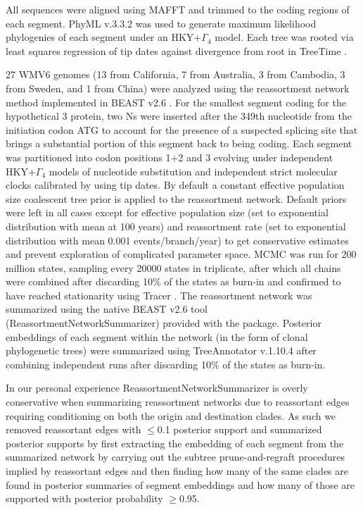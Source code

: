 \documentclass[11pt,twocolumn]{article}
\begin{document}
All sequences were aligned using MAFFT \citep{katoh_mafft_2005} and trimmed to the coding regions of each segment.
PhyML v.3.3.2 was used to generate maximum likelihood phylogenies of each segment under an HKY+$\Gamma_{4}$ \citep{hasegawa_dating_1985,yang_maximum_1994} model.
Each tree was rooted via least squares regression of tip dates against divergence from root in TreeTime \citep{sagulenko_treetime_2018}.


27 WMV6 genomes (13 from California, 7 from Australia, 3 from Cambodia, 3 from Sweden, and 1 from China) were analyzed using the reassortment network method \citep{muller_bayesian_2020} implemented in BEAST v2.6 \citep{bouckaert_beast_2019}.
For the smallest segment coding for the hypothetical 3 protein, two Ns were inserted after the 349th nucleotide from the initiation codon ATG to account for the presence of a suspected splicing site \citep{batson_single_2021} that brings a substantial portion of this segment back to being coding.
Each segment was partitioned into codon positions 1+2 and 3 evolving under independent HKY+$\Gamma_{4}$ \citep{hasegawa_dating_1985} models of nucleotide substitution and independent strict molecular clocks calibrated by using tip dates.
By default a constant effective population size coalescent tree prior is applied to the reassortment network.
Default priors were left in all cases except for effective population size (set to exponential distribution with mean at 100 years) and reassortment rate (set to exponential distribution with mean 0.001 events/branch/year) to get conservative estimates and prevent exploration of complicated parameter space.
MCMC was run for 200 million states, sampling every 20000 states in triplicate, after which all chains were combined after discarding 10\% of the states as burn-in and confirmed to have reached stationarity using Tracer \citep{rambaut_posterior_2018}.
The reassortment network was summarized using the native BEAST v2.6 tool (ReassortmentNetworkSummarizer) provided with the package.
Posterior embeddings of each segment within the network (in the form of clonal phylogenetic trees) were summarized using TreeAnnotator v.1.10.4 after combining independent runs after discarding 10\% of the states as burn-in.

In our personal experience ReassortmentNetworkSummarizer is overly conservative when summarizing reassortment networks due to reassortant edges requiring conditioning on both the origin and destination clades.
As such we removed reassortant edges with $\leq$0.1 posterior support and summarized posterior supports by first extracting the embedding of each segment from the summarized network by carrying out the subtree prune-and-regraft procedures implied by reassortant edges and then finding how many of the same clades are found in posterior summaries of segment embeddings and how many of those are supported with posterior probability $\geq$0.95.
\end{document}
